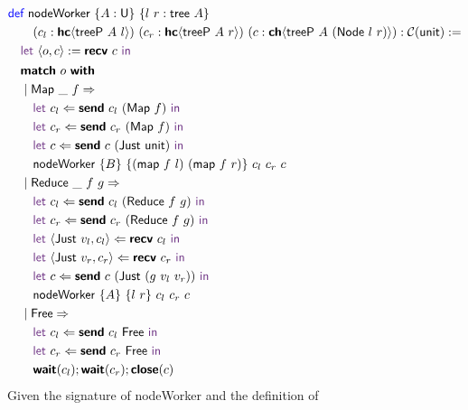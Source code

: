 \vspace{-1em}
\begingroup
\small
\addtolength{\jot}{-0.25em}
\begin{align*}
  &\Def\ \textsf{nodeWorker}\ \{A : \Un\}\ \{l\ r : \textsf{tree}\ A\}\\
  &\qquad(c_l : \HC{\textsf{treeP}\ A\ l})\ (c_r : \HC{\textsf{treeP}\ A\ r})\ (c : \CH{\textsf{treeP}\ A\ (\textsf{Node}\ l\ r)}) : \CM{\textsf{unit}} := \\
  &\quad\Let\ \langle{o, c}\rangle := \Recv\ c\ \In \\
  &\quad
    \begin{alignedat}{4}
      &\Match\ o\ \With\\
      &\mid \textsf{Map}\ \_\ f \Rightarrow \\
      &\quad\Let\ c_l \Leftarrow \Send\ c_l\ (\textsf{Map}\ f)\ \In \\
      &\quad\Let\ c_r \Leftarrow \Send\ c_r\ (\textsf{Map}\ f)\ \In \\
      &\quad\Let\ c \Leftarrow \Send\ c\ (\textsf{Just}\ \textsf{unit})\ \In \\
      &\quad\textsf{nodeWorker}\ \{B\}\ \{(\textsf{map}\ f\ l)\ (\textsf{map}\ f\ r)\}\ c_l\ c_r\ c \\
      &\mid \textsf{Reduce}\ \_\ f\ g \Rightarrow \\
      &\quad\Let\ c_l \Leftarrow \Send\ c_l\ (\textsf{Reduce}\ f\ g)\ \In \\
      &\quad\Let\ c_r \Leftarrow \Send\ c_r\ (\textsf{Reduce}\ f\ g)\ \In \\
      &\quad\Let\ \langle{\textsf{Just}\ v_l, c_l}\rangle \Leftarrow \Recv\ c_l\ \In \\
      &\quad\Let\ \langle{\textsf{Just}\ v_r, c_r}\rangle \Leftarrow \Recv\ c_r\ \In \\
      &\quad\Let\ c \Leftarrow \Send\ c\ (\textsf{Just}\ (g\ v_l\ v_r))\ \In \\
      &\quad\textsf{nodeWorker}\ \{A\}\ \{l\ r\}\ c_l\ c_r\ c \\
      &\mid \textsf{Free} \Rightarrow \\
      &\quad\Let\ c_l \Leftarrow \Send\ c_l\ \textsf{Free}\ \In \\
      &\quad\Let\ c_r \Leftarrow \Send\ c_r\ \textsf{Free}\ \In \\
      &\quad\Wait(c_l); \Wait(c_r); \Close(c)
    \end{alignedat}
\end{align*}
\endgroup
Given the signature of \textsf{nodeWorker} and the definition of
